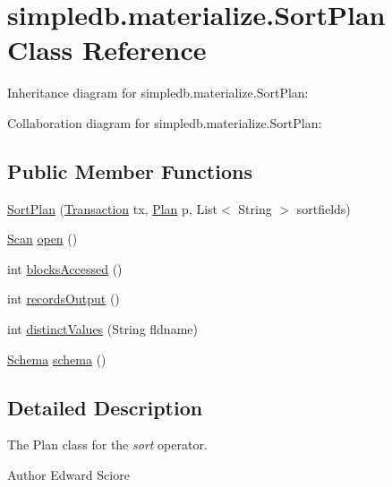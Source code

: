 \hypertarget{classsimpledb_1_1materialize_1_1SortPlan}{}\section{simpledb.\+materialize.\+Sort\+Plan Class Reference}
\label{classsimpledb_1_1materialize_1_1SortPlan}


Inheritance diagram for simpledb.\+materialize.\+Sort\+Plan\+:


Collaboration diagram for simpledb.\+materialize.\+Sort\+Plan\+:
\subsection*{Public Member Functions}
\begin{DoxyCompactItemize}
\item 
\hyperlink{classsimpledb_1_1materialize_1_1SortPlan_aeaebf38c56d30bf863a10a6e18c624a7}{Sort\+Plan} (\hyperlink{classsimpledb_1_1tx_1_1Transaction}{Transaction} tx, \hyperlink{interfacesimpledb_1_1plan_1_1Plan}{Plan} p, List$<$ String $>$ sortfields)
\item 
\hyperlink{interfacesimpledb_1_1query_1_1Scan}{Scan} \hyperlink{classsimpledb_1_1materialize_1_1SortPlan_ace1a90e7d7d4b498e0b1c6ef5d30e4a4}{open} ()
\item 
int \hyperlink{classsimpledb_1_1materialize_1_1SortPlan_ab5541a8f02fbd3b751dfdb2af86283e0}{blocks\+Accessed} ()
\item 
int \hyperlink{classsimpledb_1_1materialize_1_1SortPlan_a1bcfa71f5e5f33c4bd484d68b6121fbd}{records\+Output} ()
\item 
int \hyperlink{classsimpledb_1_1materialize_1_1SortPlan_a7742b83f40664e6a497f87b0e1df958f}{distinct\+Values} (String fldname)
\item 
\hyperlink{classsimpledb_1_1record_1_1Schema}{Schema} \hyperlink{classsimpledb_1_1materialize_1_1SortPlan_a38d147acf86926b81ce04c9ba6216e63}{schema} ()
\end{DoxyCompactItemize}


\subsection{Detailed Description}
The Plan class for the {\itshape sort} operator. \begin{DoxyAuthor}{Author}
Edward Sciore 
\end{DoxyAuthor}


